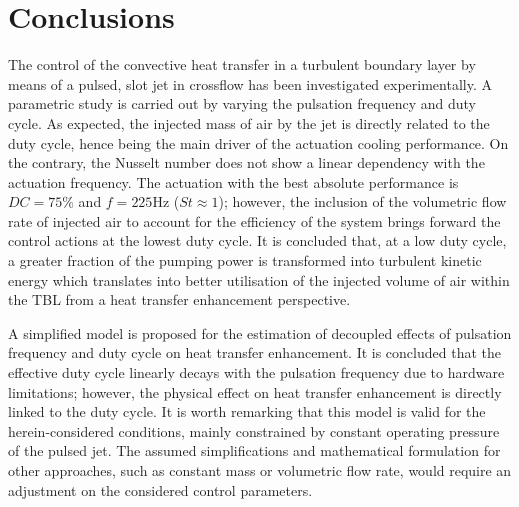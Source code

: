 \section{Conclusions \label{s:Conclusions}}
%
The control of the convective heat transfer in a turbulent boundary layer by means of a pulsed, slot jet in crossflow has been investigated experimentally. A parametric study is carried out by varying the pulsation frequency and duty cycle. As expected, the injected mass of air by the jet is directly related to the duty cycle, hence being the main driver of the actuation cooling performance. On the contrary, the Nusselt number does not show a linear dependency with the actuation frequency. The actuation with the best absolute performance is $DC = 75\%$ and $f=225\mathrm{Hz}$ ($St \approx 1$); however, the inclusion of the volumetric flow rate of injected air to account for the efficiency of the system brings forward the control actions at the lowest duty cycle. It is concluded that, at a low duty cycle, a greater fraction of the pumping power is transformed into turbulent kinetic energy which translates into better utilisation of the injected volume of air within the TBL from a heat transfer enhancement perspective.

A simplified model is proposed for the estimation of decoupled effects of pulsation frequency and duty cycle on heat transfer enhancement. It is concluded that the effective duty cycle linearly decays with the pulsation frequency due to hardware limitations; however, the physical effect on heat transfer enhancement is directly linked to the duty cycle. It is worth remarking that this model is valid for the herein-considered conditions, mainly constrained by constant operating pressure of the pulsed jet. The assumed simplifications and mathematical formulation for other approaches, such as constant mass or volumetric flow rate, would require an adjustment on the considered control parameters.

